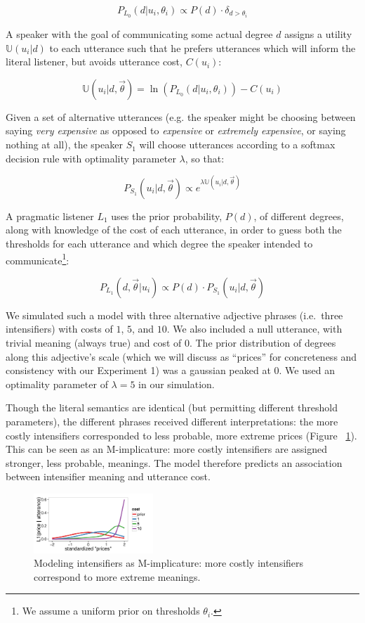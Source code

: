 \documentclass[10pt,letterpaper]{article}
\newcommand{\w}[1]{\emph{#1}}
\begin{document}
$$P_{L_0}(d|u_i, \theta_i) \propto P(d) \cdot \delta_{d > \theta_i}$$

A speaker with the goal of communicating some actual degree $d$ assigns a utility $\mathbb{U}(u_i|d)$ to each utterance such that he prefers utterances which will inform the literal listener, but avoids utterance cost, $C(u_i)$:

$$\mathbb{U}(u_i | d, \vec{\theta}) =  \ln\left(P_{L_0}(d | u_i, \theta_i) \right) - C(u_i) $$

Given a set of alternative utterances (e.g. the speaker might be choosing between saying \w{very expensive} as opposed to \w{expensive} or \w{extremely expensive}, or saying nothing at all), the speaker $S_1$ will choose utterances according to a softmax decision rule \cite{sutton} with optimality parameter $\lambda$, so that:

$$ P_{S_1}(u_i | d, \vec{\theta}) \propto e^{\lambda \mathbb{U}(u_i | d, \vec{\theta})} $$

A pragmatic listener $L_1$ uses the prior probability, $P(d)$, of different degrees, along with knowledge of the cost of each utterance, in order to guess both the thresholds for each utterance and which degree the speaker intended to communicate\footnote{We assume a uniform prior on thresholds $\theta_i$.}:

$$ P_{L_1}(d, \vec{\theta} | u_i) \propto P(d) \cdot P_{S_1}(u_i | d, \vec{\theta}) $$

We simulated such a model with three alternative adjective phrases (i.e.~three intensifiers) with costs of $1$, $5$, and $10$. We also included a null utterance, with trivial meaning (always true) and cost of $0$. The prior distribution of degrees along this adjective's scale (which we will discuss as ``prices'' for concreteness and consistency with our Experiment 1) was a gaussian peaked at $0$.
We used an optimality parameter of $\lambda=5$ in our simulation. 

Though the literal semantics are identical (but permitting different threshold parameters), the different phrases received different interpretations: the more costly intensifiers corresponded to less probable, more extreme prices (Figure ~\ref{model}). This can be seen as an M-implicature: more costly intensifiers are assigned stronger, less probable, meanings. 
The model therefore predicts an association between intensifier meaning and utterance cost.

\begin{figure}[tbh]
\begin{center}
\includegraphics[width=0.4\textwidth]{model_results.pdf}
\end{center}
\caption{Modeling intensifiers as M-implicature: more costly intensifiers correspond to more extreme meanings.} 
\label{model}
\end{figure}
\end{document}
